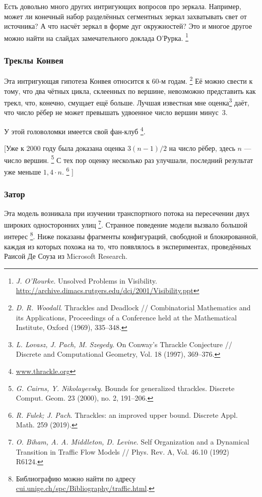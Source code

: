 \documentclass[twoside]{book}
\begin{document}
Есть довольно много других интригующих вопросов про зеркала.
Например, может ли конечный набор разделённых сегментных зеркал захватывать свет от источника?
А что насчёт зеркал в форме дуг окружностей?
Это и многое другое можно найти на слайдах замечательного доклада О’Рурка.%
\footnote{\emph{J. O'Rourke}. Unsolved Problems in Visibility. \url{http://archive.dimacs.rutgers.edu/dci/2001/Visibility.ppt}}

\subsubsection*{Треклы Конвея}

Эта интригующая гипотеза Конвея относится к 60-м годам.%
\footnote{\emph{D. R. Woodall}. Thrackles and Deadlock /\!/ {Combinatorial Mathematics and its Appli\-ca\-tions}, Proceedings of a Conference held at the Mathematical Institute, Oxford (1969), 335--348.}
Её можно свести к тому, что два чётных цикла, склеенных по вершине, невозможно представить как трекл,
что, конечно, смущает ещё больше.
Лучшая известная мне оценка\footnote{\emph{L. Lovasz, J. Pach, M. Szegedy}. On Conway's Thrackle Conjecture /\!/ {Discrete and Compu\-ta\-tional Geometry}, Vol. 18 (1997), 369--376.} даёт, что число рёбер не может превышать удвоенное число вершин минус~3.%

У этой головоломки имеется свой фан-клуб%
\footnote{\href{http://www.thrackle.org}{\url{www.thrackle.org}}}.

[Уже к 2000 году была доказана оценка $3(n-1)/2$ на число рёбер, здесь $n$ --- число вершин.%
\footnote{\emph{G. Cairns, Y. Nikolayevsky}.
Bounds for generalized thrackles.
Discrete Comput. Geom. 23 (2000), no. 2, 191--206.}
С тех пор оценку несколько раз улучшали, последний результат уже меньше $1{,}4\cdot n$.%
\footnote{\emph{R. Fulek; J. Pach}. Thrackles: an improved upper bound. Discrete Appl. Math. 259 (2019).}%
]

\subsubsection*{Затор}

Эта модель возникала при изучении транспортного потока на пересечении двух широких односторонних улиц%
\footnote{\emph{O. Biham, A. A. Middleton, D. Levine}. Self Organization and a Dynamical Transition in Traffic Flow Models /\!/ {Phys. Rev. A}, Vol. 46.10 (1992) R6124.}.
Странное поведение модели вызвало большой интерес%
\footnote{Библиографию можно найти по адресу \href{http://cui.unige.ch/spc/Bibliography/traffic.html.}{\url{cui.unige.ch/spc/Bibliography/traffic.html}}.}.
Ниже показаны фрагменты конфигураций, свободной и блокированной, каждая из которых похожа на то, что появлялось в экспериментах, проведённых Раисой Де Соуза из Microsoft Research.
\end{document}

